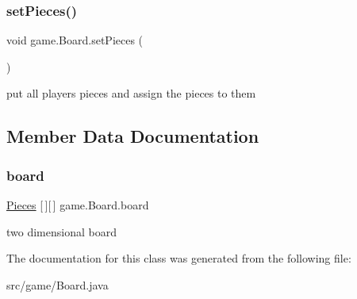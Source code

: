 \subsubsection{\texorpdfstring{set\+Pieces()}{setPieces()}}
{\footnotesize\ttfamily void game.\+Board.\+set\+Pieces (\begin{DoxyParamCaption}{ }\end{DoxyParamCaption})\hspace{0.3cm}{\ttfamily [inline]}}

put all players\textquotesingle{} pieces and assign the pieces to them 

\subsection{Member Data Documentation}
\mbox{\label{classgame_1_1_board_a88a0b3ed05aed6166209784f05fd218d}} 
\subsubsection{\texorpdfstring{board}{board}}
{\footnotesize\ttfamily \mbox{\hyperlink{classpieces_1_1_pieces}{Pieces}} \mbox{[}$\,$\mbox{]}\mbox{[}$\,$\mbox{]} game.\+Board.\+board}

two dimensional board 

The documentation for this class was generated from the following file\+:\begin{DoxyCompactItemize}
\item 
src/game/Board.\+java\end{DoxyCompactItemize}
